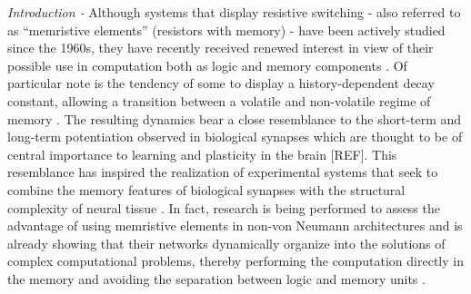 \documentclass[aps,prl,reprint,groupedaddress]{revtex4-1}
\begin{document}
\pacs{}

\maketitle



{\it Introduction -} Although systems that display resistive switching - also referred to as ``memristive elements'' (resistors with memory) - have been actively studied 
since the 1960s, they have recently received renewed interest in view of their possible use in computation both as logic and memory components \cite{Pershin2011}.
Of particular note is the tendency of some to display a history-dependent decay constant, allowing a transition
between a volatile and non-volatile regime of memory \cite{Hasegawa2010, Ohno2011}.  The resulting dynamics
bear a close resemblance to the short-term and long-term potentiation observed in
biological synapses which are thought to be of central importance to learning and
plasticity in the brain [REF].  This resemblance has inspired the realization of experimental
systems that seek to combine the memory features of biological synapses with
the structural complexity of neural tissue \cite{Avizienis2012, Stieg2014}. In fact, research is being
performed to assess the advantage of using memristive elements in non-von
Neumann architectures and is already showing that their networks 
dynamically organize into the solutions of complex computational problems, thereby
performing the computation directly in the memory and avoiding the separation
between logic and memory units \cite{Ventra2013, Pershin2013, Traversa2015, Traversa15}.  
\end{document}
